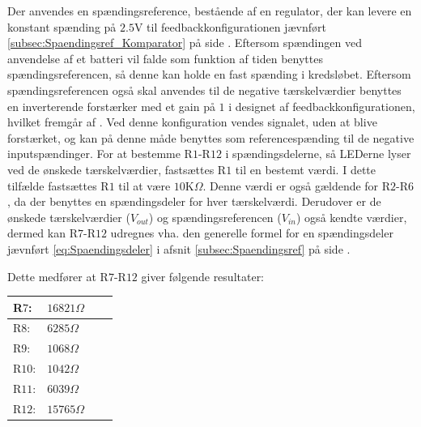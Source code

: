 \noindent Der anvendes en spændingsreference, bestående af en regulator, der kan levere en konstant spænding på $2.5$V til feedbackkonfigurationen jævnført \ref{subsec:Spaendingsref_Komparator} på side \pageref{subsec:Spaendingsref_Komparator}. Eftersom spændingen ved anvendelse af et batteri vil falde som funktion af tiden benyttes spændingsreferencen, så denne kan holde en fast spænding i kredsløbet. Eftersom spændingsreferencen også skal anvendes til de negative tærskelværdier benyttes en inverterende forstærker med et gain på $1$ i designet af feedbackkonfigurationen, hvilket fremgår af . Ved denne konfiguration vendes signalet, uden at blive forstærket, og kan på denne måde benyttes som referencespænding til de negative inputspændinger. For at bestemme R$1$-R$12$ i spændingsdelerne, så LEDerne lyser ved de ønskede tærskelværdier, fastsættes R$1$ til en bestemt værdi. I dette tilfælde fastsættes R$1$ til at være $10$K$\Omega$. Denne værdi er også gældende for R$2$-R$6$, da der benyttes en spændingsdeler for hver tærskelværdi. Derudover er de ønskede tærskelværdier ($V_{out}$) og spændingsreferencen ($V_{in}$) også kendte værdier, dermed kan R$7$-R$12$ udregnes vha. den generelle formel for en spændingsdeler jævnført \eqref{eq:Spaendingsdeler} i afsnit \ref{subsec:Spaendingsref} på side \pageref{subsec:Spaendingsref}. 

\noindent Dette medfører at R$7$-R$12$ giver følgende resultater:\\
\begin{table}[H]
	\centering
	\begin{tabular}{|l|l|l|l|} \hline
	R$7$: & $16821\Omega$ \\ \hline
	R$8$: & $6285\Omega$ \\ \hline
	R$9$: & $1068\Omega$ \\ \hline
	R$10$: & $1042\Omega$ \\ \hline
	R$11$: & $6039\Omega$ \\ \hline
	R$12$: & $15765\Omega$ \\ \hline    
	\end{tabular}
\end{table}


